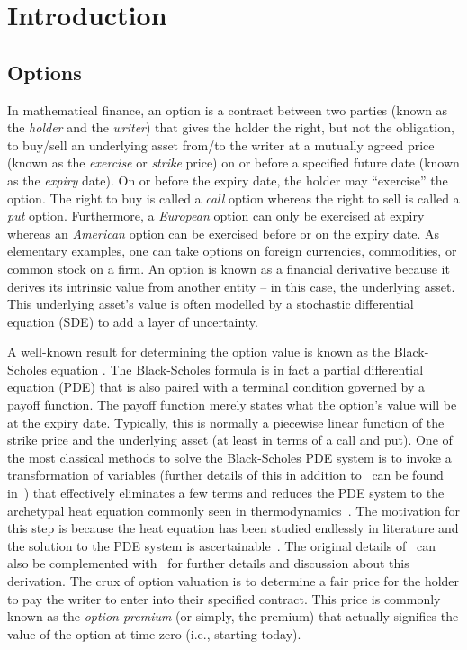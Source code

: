 \chapter{Introduction}
\section{Options}

	In mathematical finance, an option is a contract between two parties (known as the \emph{holder} and the \emph{writer}) that gives the holder the right, but not the obligation, to buy/sell an underlying asset from/to the writer at a mutually agreed price (known as the \emph{exercise} or \emph{strike} price) on or before a specified future date (known as the \emph{expiry} date). On or before the expiry date, the holder may ``exercise'' the option. The right to buy is called a \emph{call} option whereas the right to sell is called a \emph{put} option. Furthermore, a \emph{European} option can only be exercised at expiry whereas an \emph{American} option can be exercised before or on the expiry date. As elementary examples, one can take options on foreign currencies, commodities, or common stock on a firm. An option is known as a financial derivative because it derives its intrinsic value from another entity -- in this case, the underlying asset. This underlying asset's value is often modelled by a stochastic differential equation (SDE) to add a layer of uncertainty. 
	
	A well-known result for determining the option value is known as the Black-Scholes equation \cite{Black1973}. The Black-Scholes formula is in fact a partial differential equation (PDE) that is also paired with a terminal condition governed by a payoff function. The payoff function merely states what the option's value will be at the expiry date. Typically, this is normally a piecewise linear function of the strike price and the underlying asset (at least in terms of a call and put). One of the most classical methods to solve the Black-Scholes PDE system is to invoke a transformation of variables (further details of this in addition to~\cite{Black1973} can be found in~\cite{Wilmott1995}) that effectively eliminates a few terms and reduces the PDE system to the archetypal heat equation commonly seen in thermodynamics~\cite{cannon1984one}. The motivation for this step is because the heat equation has been studied endlessly in literature and the solution to the PDE system is ascertainable~\cite{Churchill1938}. The original details of~\cite{Black1973} can also be complemented with~\cite{Wilmott1995} for further details and discussion about this derivation. The crux of option valuation is to determine a fair price for the holder to pay the writer to enter into their specified contract. This price is commonly known as the \emph{option premium} (or simply, the premium) that actually signifies the value of the option at time-zero (i.e., starting today).
	

